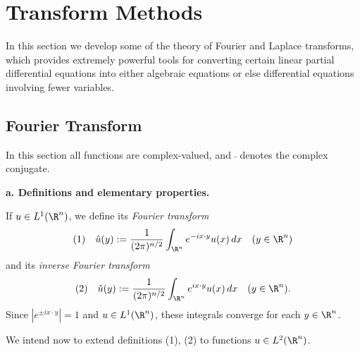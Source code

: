\section{Transform Methods}
\label{sec:transform-methods}

In this section we develop some of the theory of Fourier and Laplace transforms, which provides extremely powerful tools for converting certain linear partial differential equations into either algebraic equations or else differential equations involving fewer variables.

\subsection{Fourier Transform}
\label{sec:fourier-transform}

In this section all functions are complex-valued, and $\bar{\ }$ denotes the complex conjugate.

\textbf{a. Definitions and elementary properties.}

\begin{definition}
\label{def:fourier-transform-l1}
If $u\in L^1(\R^n)$, we define its \textit{Fourier transform}
$$(1) \quad \hat u(y) := \frac{1}{(2\pi)^{n/2}}\int_{\R^n} e^{-ix\cdot y}u(x)\,dx \quad (y\in\R^n)$$
and its \textit{inverse Fourier transform}
$$(2) \quad \check u(y) := \frac{1}{(2\pi)^{n/2}}\int_{\R^n} e^{ix\cdot y}u(x)\,dx \quad (y\in\R^n).$$
Since $|e^{\pm ix\cdot y}|=1$ and $u\in L^1(\R^n)$, these integrals converge for each $y\in\R^n$.
\end{definition}

We intend now to extend definitions (1), (2) to functions $u\in L^2(\R^n)$.

